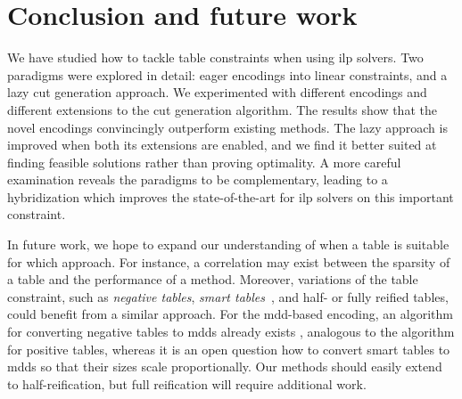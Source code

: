 \documentclass[a4paper,UKenglish,cleveref,autoref,thm-restate]{lipics-v2021}
\begin{document}
\section{Conclusion and future work}

We have studied how to tackle table constraints when using \gls{ilp} solvers.
Two paradigms were explored in detail: eager encodings into linear constraints, and a lazy cut generation approach.
We experimented with different encodings and different extensions to the cut generation algorithm.
The results show that the novel encodings convincingly outperform existing methods.
The lazy approach is improved when both its extensions are enabled, and we find it better suited at finding feasible solutions rather than proving optimality.
A more careful examination reveals the paradigms to be complementary, leading to a hybridization which improves the state-of-the-art for \gls{ilp} solvers on this important constraint.

In future work, we hope to expand our understanding of when a table is suitable for which approach.
For instance, a correlation may exist between the sparsity of a table and the performance of a method.
Moreover, variations of the table constraint, such as \textit{negative tables}, \textit{smart tables}~\cite{DBLP:conf/cpaior/MairyDL15}, and half- or fully reified tables, could benefit from a similar approach.
For the \gls{mdd}-based encoding, an algorithm for converting negative tables to \glspl{mdd} already exists \cite{DBLP:journals/constraints/ChengY10}, analogous to the algorithm for positive tables, whereas it is an open question how to convert smart tables to \glspl{mdd} so that their sizes scale proportionally.
Our methods should easily extend to half-reification, but full reification will require additional work. 



\end{document}
